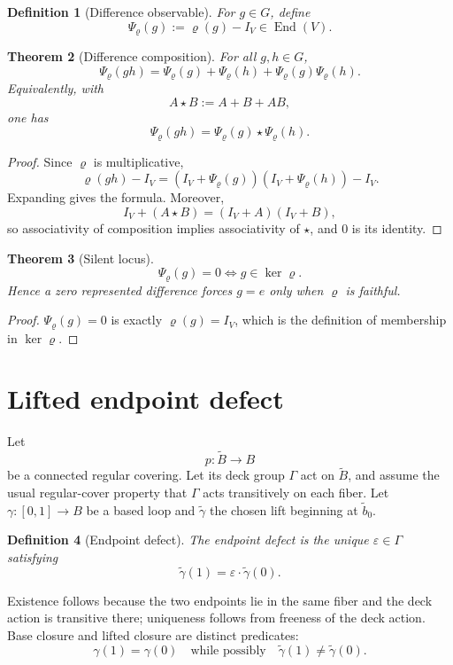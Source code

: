 \documentclass[11pt]{article}
\newtheorem{theorem}{Theorem}[section]
\newtheorem{definition}[theorem]{Definition}
\begin{document}
\begin{definition}[Difference observable]
For $g\in G$, define
\[
\Psi_{\varrho}(g):=\varrho(g)-I_V\in\operatorname{End}(V).
\]
\end{definition}

\begin{theorem}[Difference composition]\label{thm:difference}
For all $g,h\in G$,
\[
\Psi_{\varrho}(gh)
=
\Psi_{\varrho}(g)+\Psi_{\varrho}(h)+\Psi_{\varrho}(g)\Psi_{\varrho}(h).
\]
Equivalently, with
\[
A\star B:=A+B+AB,
\]
one has
\[
\Psi_{\varrho}(gh)=\Psi_{\varrho}(g)\star\Psi_{\varrho}(h).
\]
\end{theorem}
\begin{proof}
Since $\varrho$ is multiplicative,
\[
\varrho(gh)-I_V
=
(I_V+\Psi_{\varrho}(g))(I_V+\Psi_{\varrho}(h))-I_V.
\]
Expanding gives the formula. Moreover,
\[
I_V+(A\star B)=(I_V+A)(I_V+B),
\]
so associativity of composition implies associativity of $\star$, and $0$ is its identity.
\end{proof}

\begin{theorem}[Silent locus]\label{thm:silent-locus}
\[
\Psi_{\varrho}(g)=0
\iff
g\in\ker\varrho.
\]
Hence a zero represented difference forces $g=e$ only when $\varrho$ is faithful.
\end{theorem}
\begin{proof}
$\Psi_{\varrho}(g)=0$ is exactly $\varrho(g)=I_V$, which is the definition of membership in $\ker\varrho$.
\end{proof}

\section{Lifted endpoint defect}
Let
\[
p:\widetilde B\to B
\]
be a connected regular covering. Let its deck group $\Gamma$ act on $\widetilde B$, and assume the usual regular-cover property that $\Gamma$ acts transitively on each fiber. Let $\gamma:[0,1]\to B$ be a based loop and $\widetilde\gamma$ the chosen lift beginning at $\widetilde b_0$.

\begin{definition}[Endpoint defect]
The endpoint defect is the unique $\varepsilon\in\Gamma$ satisfying
\[
\widetilde\gamma(1)=\varepsilon\cdot\widetilde\gamma(0).
\]
\end{definition}
Existence follows because the two endpoints lie in the same fiber and the deck action is transitive there; uniqueness follows from freeness of the deck action. Base closure and lifted closure are distinct predicates:
\[
\gamma(1)=\gamma(0)
\quad\text{while possibly}\quad
\widetilde\gamma(1)\neq\widetilde\gamma(0).
\]
\end{document}

